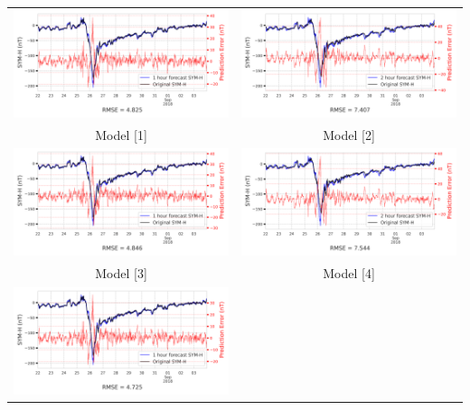 \documentclass[draft,sw]{agutexSI2019}
\begin{document}
\begin{table}
\centering
\begin{tabular}{cc}
\includegraphics[width=0.49\linewidth]{paper_plots/1h_swics/1h_swics_storm_42.png}
&
\includegraphics[width=0.49\linewidth]{paper_plots/2h_swics/2h_swics_storm_42.png}
\\
Model [1] & Model [2]
\vspace*{12pt}
\\
\includegraphics[width=0.49\linewidth]{paper_plots/1h_no_swics/1h_no_swics_storm_42.png}
&
\includegraphics[width=0.49\linewidth]{paper_plots/2h_no_swics/2h_no_swics_storm_42.png}
\\
Model [3] & Model [4]
\vspace*{12pt}
\\
\includegraphics[width=0.49\linewidth]{paper_plots/1h_swics_model_on_no_swics/1h_swics_model_on_no_swics_storm_42.png}

\end{tabular}
\end{table}
\end{document}
